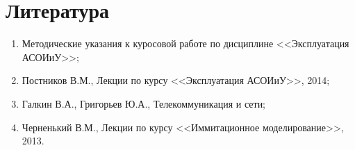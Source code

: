 \documentclass[russian,utf8,emptystyle]{eskdtext}
\begin{document}
\clearpage
\section{Литература}
\begin{enumerate}[label=\arabic*)]
\item Методические указания к куросовой работе по дисциплине <<Эксплуатация АСОИиУ>>;
\item Постников В.М., Лекции по курсу <<Эксплуатация АСОИиУ>>, 2014;
\item Галкин В.А., Григорьев Ю.А., Телекоммуникация и сети;
\item Черненький В.М., Лекции по курсу <<Иммитационное моделирование>>, 2013.
\end{enumerate}
\end{document}
